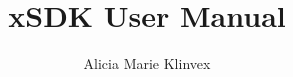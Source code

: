 \documentclass[pdf,12pt,report,strict]{SANDreport}
\title{xSDK User Manual}
\author{Alicia Marie Klinvex}
\begin{document}
\maketitle





\SANDmain




\end{document}
